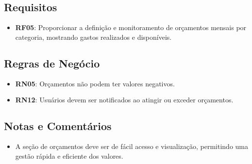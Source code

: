 \subsection*{Requisitos}
\begin{addmargin}[1.5cm]{0cm}
	\begin{itemize}
		\item \textbf{RF05}: Proporcionar a definição e monitoramento de orçamentos mensais por categoria, mostrando gastos realizados e disponíveis.
	\end{itemize}
\end{addmargin}

\subsection*{Regras de Negócio}
\begin{addmargin}[1.5cm]{0cm}
    \begin{itemize}
        \item \textbf{RN05}: Orçamentos não podem ter valores negativos.
        \item \textbf{RN12}: Usuários devem ser notificados ao atingir ou exceder orçamentos.
    \end{itemize}
\end{addmargin}

\subsection*{Notas e Comentários}
\begin{addmargin}[1.5cm]{0cm}
    \begin{itemize}
        \item A seção de orçamentos deve ser de fácil acesso e visualização, permitindo uma gestão rápida e eficiente dos valores.
    \end{itemize}
\end{addmargin}
